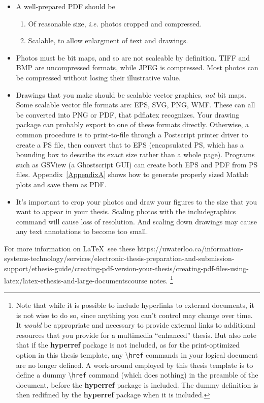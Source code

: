 \documentclass[letterpaper,12pt,titlepage,oneside,final]{book}
\newcommand{\package}[1]{\textbf{#1}} %
\newcommand{\cmmd}[1]{\textbackslash\texttt{#1}} %
\newcommand{\href}[1]{#1} %
\begin{document}
\begin{itemize}
\item A well-prepared PDF should be 
  \begin{enumerate}
    \item Of reasonable size, {\it i.e.} photos cropped and compressed.
    \item Scalable, to allow enlargment of text and drawings. 
  \end{enumerate} 
\item Photos must be bit maps, and so are not scaleable by definition. TIFF and
BMP are uncompressed formats, while JPEG is compressed. Most photos can be
compressed without losing their illustrative value.
\item Drawings that you make should be scalable vector graphics, \emph{not} 
bit maps. Some scalable vector file formats are: EPS, SVG, PNG, WMF. These can
all be converted into PNG or PDF, that pdflatex recognizes. Your drawing 
package can probably export to one of these formats directly. Otherwise, a 
common procedure is to print-to-file through a Postscript printer driver to 
create a PS file, then convert that to EPS (encapsulated PS, which has a 
bounding box to describe its exact size rather than a whole page). 
Programs such as GSView (a Ghostscript GUI) can create both EPS and PDF from PS files.
Appendix~\ref{AppendixA} shows how to generate properly sized Matlab plots and save them as PDF.
\item It's important to crop your photos and draw your figures to the size that
you want to appear in your thesis. Scaling photos with the 
includegraphics command will cause loss of resolution. And scaling down 
drawings may cause any text annotations to become too small.
\end{itemize}

For more information on \LaTeX\, see these  \href{https://uwaterloo.ca/information-systems-technology/services/electronic-thesis-preparation-and-submission-support/ethesis-guide/creating-pdf-version-your-thesis/creating-pdf-files-using-latex/latex-ethesis-and-large-documents}{course notes}. 
\footnote{
Note that while it is possible to include hyperlinks to external documents,
it is not wise to do so, since anything you can't control may change over time. 
It \emph{would} be appropriate and necessary to provide external links to 
additional resources that you provide for a multimedia ``enhanced'' thesis. 
But also note that if the \package{hyperref} package is not included, 
as for the print-optimized option in this thesis template, any \cmmd{href} 
commands in your logical document are no longer defined.
A work-around employed by this thesis template is to define a dummy \cmmd{href} 
command (which does nothing) in the preamble of the document, 
before the \package{hyperref} package is included. 
The dummy definition is then redifined by the
\package{hyperref} package when it is included.
}
\end{document}
